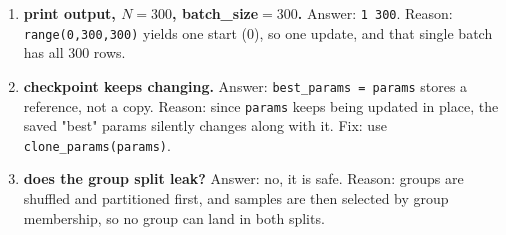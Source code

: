 \documentclass[11pt]{article}
\begin{document}
\begin{enumerate}
\item \textbf{print output, $N=300$, batch\_size$=300$.}
Answer: \texttt{1 300}.
Reason: \texttt{range(0,300,300)} yields one start (0), so one update, and
that single batch has all 300 rows.

\item \textbf{checkpoint keeps changing.}
Answer: \texttt{best\_params = params} stores a reference, not a copy.
Reason: since \texttt{params} keeps being updated in place, the saved
"best" params silently changes along with it. Fix: use
\texttt{clone\_params(params)}.

\item \textbf{does the group split leak?}
Answer: no, it is safe.
Reason: groups are shuffled and partitioned first, and samples are then
selected by group membership, so no group can land in both splits.

\end{enumerate}
\end{document}
